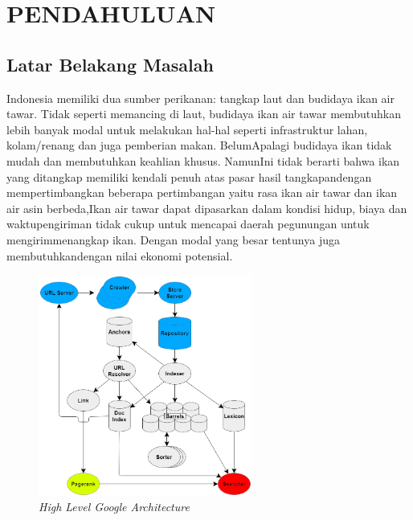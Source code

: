 
\chapter{PENDAHULUAN}

\section{Latar Belakang Masalah}

Indonesia memiliki dua sumber perikanan: tangkap laut dan budidaya ikan air tawar. Tidak seperti memancing di laut, budidaya ikan air tawar membutuhkan lebih banyak modal untuk melakukan hal-hal seperti infrastruktur lahan, kolam/renang dan juga pemberian makan. BelumApalagi budidaya ikan  tidak mudah dan membutuhkan keahlian khusus. NamunIni tidak berarti bahwa ikan yang ditangkap memiliki kendali penuh atas pasar hasil tangkapandengan mempertimbangkan beberapa pertimbangan yaitu rasa ikan air tawar dan ikan air asin berbeda,Ikan air tawar  dapat dipasarkan dalam kondisi hidup, biaya dan waktupengiriman tidak cukup untuk mencapai daerah pegunungan untuk mengirimmenangkap ikan. Dengan modal yang besar tentunya  juga membutuhkandengan nilai ekonomi potensial.

\begin{figure}[H]
	\centering
	\includegraphics[keepaspectratio, width=7cm]{gambar/google_architecture_filled}
	\caption{\emph{High Level Google Architecture} \citep{brin1998anatomy}}
	\label{gambar:google_architecture_filled}
\end{figure}

